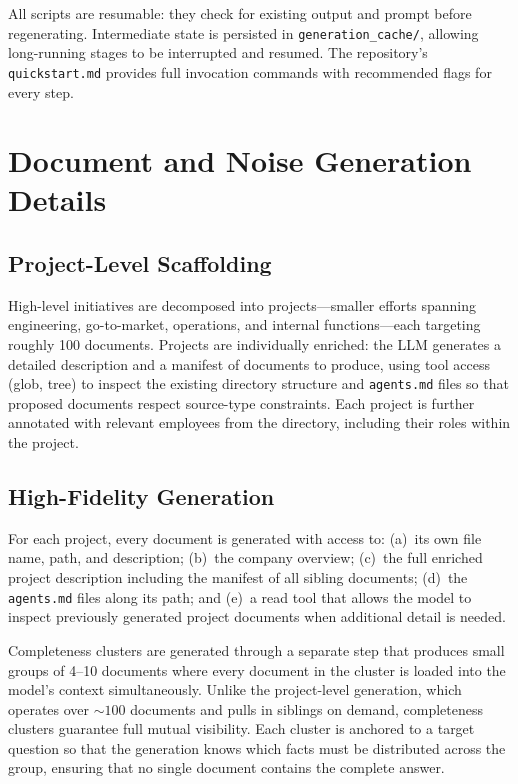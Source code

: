 \documentclass{article}
\begin{document}
All scripts are resumable: they check for existing output and prompt before regenerating. Intermediate state is persisted in \texttt{generation\_cache/}, allowing long-running stages to be interrupted and resumed. The repository's \texttt{quickstart.md} provides full invocation commands with recommended flags for every step.

\section{Document and Noise Generation Details}
\label{app:docgen}

\subsection{Project-Level Scaffolding}
\label{app:project_scaffolding}

High-level initiatives are decomposed into projects---smaller efforts spanning engineering, go-to-market, operations, and internal functions---each targeting roughly 100 documents. Projects are individually enriched: the LLM generates a detailed description and a manifest of documents to produce, using tool access (glob, tree) to inspect the existing directory structure and \texttt{agents.md} files so that proposed documents respect source-type constraints. Each project is further annotated with relevant employees from the directory, including their roles within the project.

\subsection{High-Fidelity Generation}
\label{app:highfidelity}

For each project, every document is generated with access to: (a)~its own file name, path, and description; (b)~the company overview; (c)~the full enriched project description including the manifest of all sibling documents; (d)~the \texttt{agents.md} files along its path; and (e)~a read tool that allows the model to inspect previously generated project documents when additional detail is needed.

Completeness clusters are generated through a separate step that produces small groups of 4--10 documents where every document in the cluster is loaded into the model's context simultaneously. Unlike the project-level generation, which operates over ${\sim}100$ documents and pulls in siblings on demand, completeness clusters guarantee full mutual visibility. Each cluster is anchored to a target question so that the generation knows which facts must be distributed across the group, ensuring that no single document contains the complete answer.
\end{document}

